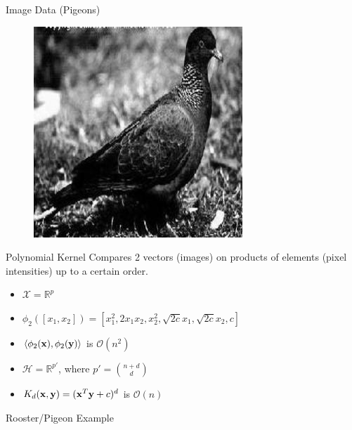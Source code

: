 \documentclass{beamer}
\begin{document}
\begin{frame}{Image Data (Pigeons)}
\begin{figure}
    \includegraphics[scale=.35]{pigeonrs-image_0004.jpg}
  \end{figure}
\end{frame}

\begin{frame}{Polynomial Kernel}
  Compares 2 vectors (images) on products of elements (pixel intensities)
  up to a certain order.
  \begin{itemize}
    \item $\mathcal{X} = \mathbb{R}^{p}$ \pause
    \item $\phi_2 ([x_1, x_2]) = [x_1^2,  2x_1x_2,  x_2^2, \sqrt{2c}x_1, \sqrt{2c}x_2, c]$ \pause
    \item $\langle \phi_2({\bf x}), \phi_2({\bf y}) \rangle$ is $\mathcal{O}(n^2)$ \pause
    \item $\mathcal{H} = \mathbb{R}^{p'}$, where $p' = \binom{n+d}{d}$ \pause
    \item $K_d({\bf x},{\bf y}) = ({\bf x}^T {\bf y}  + c)^d$ is $\mathcal{O}(n)$
  \end{itemize}
\end{frame}

\begin{frame}{Rooster/Pigeon Example}
  \begin{center}
    \resizebox{10.0cm}{!}{
      
    }
  \end{center}
\end{frame}
\end{document}
